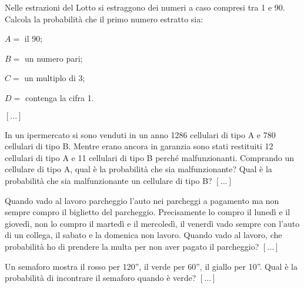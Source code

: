 \begin{esercizio}
 \label{ese:9.24}
Nelle estrazioni del Lotto si estraggono dei numeri a caso compresi tra 1 e 90. 
Calcola la probabilità che il primo numero estratto sia:
\begin{multicols}{2}
\begin{itemize*}
\item $ A= $ il 90;
\item $ B= $ un numero pari;
\item $ C= $ un multiplo di 3;
\item $ D= $ contenga la cifra 1.
\end{itemize*}
\end{multicols}
\hfill $\left[...\right]$
\end{esercizio}

\begin{esercizio}
 \label{ese:9.25}
In un ipermercato si sono venduti in un anno 1286 cellulari di tipo A e 780 
cellulari di tipo B. Mentre erano ancora in garanzia sono stati restituiti 12 
cellulari di tipo A e 11 cellulari di tipo B perché malfunzionanti. Comprando un 
cellulare di tipo A, qual è la probabilità che sia malfunzionante? Qual è la 
probabilità che sia malfunzionante un cellulare di tipo B?
\hfill $\left[...\right]$
\end{esercizio}

\begin{esercizio}
 \label{ese:9.26}
Quando vado al lavoro parcheggio l'auto nei parcheggi a pagamento ma non sempre 
compro il biglietto del parcheggio. Precisamente lo compro il lunedì e il 
giovedì, non lo compro il martedì e il mercoledì, il venerdì vado sempre con 
l'auto di un collega, il sabato e la domenica non lavoro. Quando vado al lavoro, 
che probabilità ho di prendere la multa per non aver pagato il parcheggio?
\hfill $\left[...\right]$
\end{esercizio}

\begin{esercizio}
 \label{ese:9.27}
Un semaforo mostra il rosso per 120'', il verde per 60'', il giallo per 10''. 
Qual è la probabilità di incontrare il semaforo quando è verde?
\hfill $\left[...\right]$
\end{esercizio}

